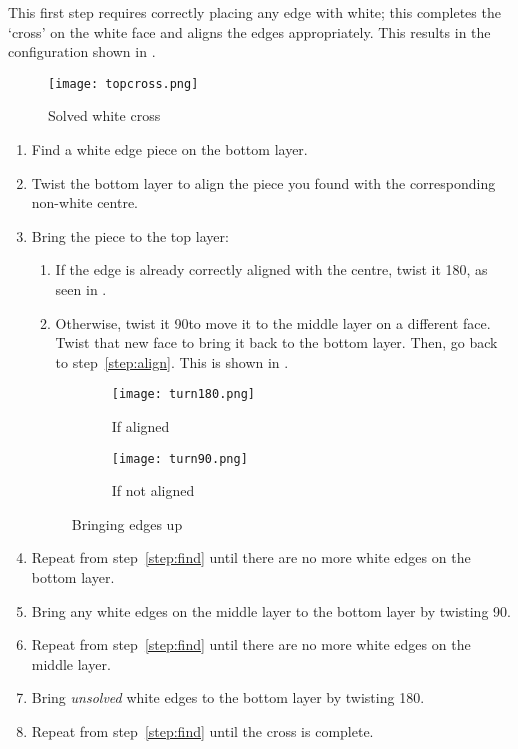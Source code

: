 	This first step requires correctly placing any edge with white; this completes the `cross' on the white face and aligns the edges appropriately. This results in the configuration shown in .
\begin{figure}[h]
	\centering
	\texttt{[image: topcross.png]}
	\caption{Solved white cross}\label{fig:topcross}
\end{figure}

\begin{enumerate}
	\item \label{step:find} Find a white edge piece on the bottom layer.
	\item \label{step:align} Twist the bottom layer to align the piece you found with the corresponding non-white centre.
	\item Bring the piece to the top layer:\begin{enumerate}
		\item If the edge is already correctly aligned with the centre, twist it 180\degree , as seen in .
		\item Otherwise, twist it 90\degree  to move it to the middle layer on a different face. Twist that new face to bring it back to the bottom layer. Then, go back to step~\ref{step:align}. This is shown in .
	\end{enumerate}
\begin{figure}[h]
	\centering
	\begin{subfigure}[b]{0.3\textwidth}
		\texttt{[image: turn180.png]}
		\caption{If aligned}{\label{fig:edgeup180}}
	\end{subfigure}
	\begin{subfigure}[b]{0.3\textwidth}
		\texttt{[image: turn90.png]}
		\caption{If not aligned}{\label{fig:edgeup90}}
	\end{subfigure}
	\caption{Bringing edges up}
\end{figure}
\newpage
	\item Repeat from step~\ref{step:find} until there are no more white edges on the bottom layer.
	\item Bring any white edges on the middle layer to the bottom layer by twisting 90\degree .
	\item Repeat from step~\ref{step:find} until there are no more white edges on the middle layer.
	\item Bring \emph{unsolved} white edges to the bottom layer by twisting 180\degree .
	\item Repeat from step~\ref{step:find} until the cross is complete.
\end{enumerate}

